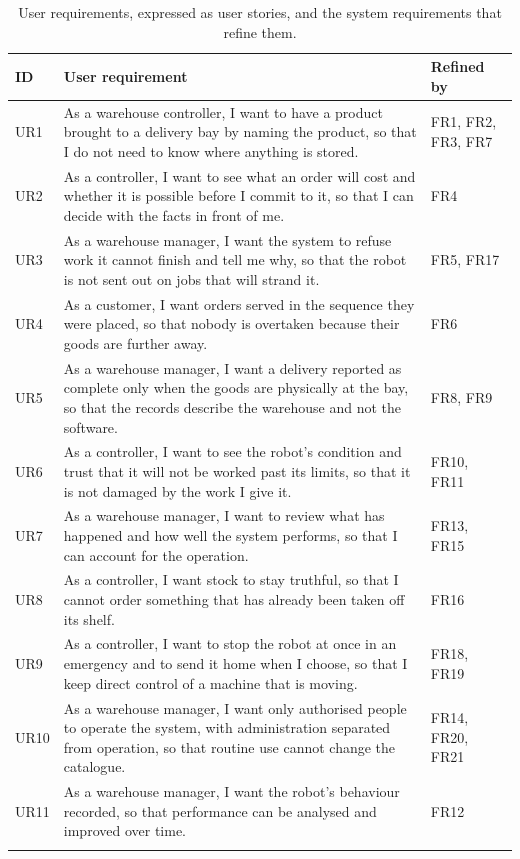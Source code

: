\documentclass[12pt,a4paper]{report}
\begin{document}
\begin{longtable}{@{}p{}p{}p{}@{}}
\toprule
\textbf{ID} & \textbf{User requirement} & \textbf{Refined by} \\
\midrule
\endhead
UR1 & As a warehouse controller, I want to have a product brought to a delivery bay by naming the
product, so that I do not need to know where anything is stored. & FR1, FR2, FR3, FR7 \\
UR2 & As a controller, I want to see what an order will cost and whether it is possible before I
commit to it, so that I can decide with the facts in front of me. & FR4 \\
UR3 & As a warehouse manager, I want the system to refuse work it cannot finish and tell me why,
so that the robot is not sent out on jobs that will strand it. & FR5, FR17 \\
UR4 & As a customer, I want orders served in the sequence they were placed, so that nobody is
overtaken because their goods are further away. & FR6 \\
UR5 & As a warehouse manager, I want a delivery reported as complete only when the goods are
physically at the bay, so that the records describe the warehouse and not the software. & FR8, FR9 \\
UR6 & As a controller, I want to see the robot's condition and trust that it will not be worked
past its limits, so that it is not damaged by the work I give it. & FR10, FR11 \\
UR7 & As a warehouse manager, I want to review what has happened and how well the system performs,
so that I can account for the operation. & FR13, FR15 \\
UR8 & As a controller, I want stock to stay truthful, so that I cannot order something that has
already been taken off its shelf. & FR16 \\
UR9 & As a controller, I want to stop the robot at once in an emergency and to send it home when I
choose, so that I keep direct control of a machine that is moving. & FR18, FR19 \\
UR10 & As a warehouse manager, I want only authorised people to operate the system, with
administration separated from operation, so that routine use cannot change the catalogue. & FR14,
FR20, FR21 \\
UR11 & As a warehouse manager, I want the robot's behaviour recorded, so that performance can be
analysed and improved over time. & FR12 \\
\bottomrule
\caption{User requirements, expressed as user stories, and the system requirements that refine
them.}
\label{tab:ur}
\end{longtable}
\end{document}
